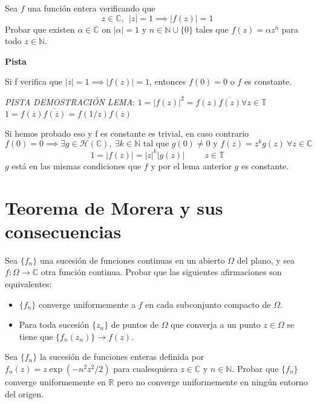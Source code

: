 \begin{ejer}
	Sea $f$ una función entera verificando que
	$$ z\in\mathbb{C}, \ \ |z|=1 \implies |f(z)|=1 $$
	Probar que existen $\alpha\in\mathbb{C}$ on $|\alpha|=1$ y $n\in\mathbb{N}\cup \{0\}$ tales que $f(z) = \alpha z^n$ para todo $z\in\mathbb{N}$.
\end{ejer}
\begin{sol}
	
	\textbf{Pista}
	
	\begin{lema}
		
		Si f verifica que $|z|=1 \implies |f(z)|=1$, entonces $f(0)=0$ o $f$ es constante.
		
		\textit{PISTA DEMOSTRACIÓN LEMA}:
		$1=|f(z)|^2 = f(z)\overline{f(z)} \forall z\in\mathbb{T}$ 
		$1= f(\overline{z})\overline{f(\overline{z})} = f(1/z)\overline{f(\overline{z})}$
	\end{lema}
	
	
	Si hemos probado eso y f es constante es trivial, en caso contrario
	$$f(0)=0 \implies \exists g\in\mathcal{H}(\mathbb{C}), \ \exists k\in\mathbb{N} \text{ tal que }g(0) \not =0 \text{ y }f(z) = z^kg(z)\ \forall z\in\mathbb{C}$$
	$$1=|f(z)| = |z|^k|g(z)| \hspace{1cm} z\in\mathbb{T}$$
	$g$ está en las mismas condiciones que $f$ y por el lema anterior $g$ es constante.
\end{sol}

\newpage


\section{Teorema de Morera y sus consecuencias}
\begin{ejer}
	Sea $\{f_n\}$ una sucesión de funciones continuas en un abierto $\Omega$ del plano, y sea $f:\Omega\rightarrow\mathbb{C}$ otra función continua. Probar que las siguientes afirmaciones son equivalentes:
	\begin{itemize}
		\item $\{f_n\}$ converge uniformemente a $f$ en cada subconjunto compacto de $\Omega$.
		\item Para toda sucesión $\{z_n\}$ de puntos de $\Omega$ que converja a un punto $z\in\Omega$ se tiene que $\{f_n(z_n)\}\rightarrow f(z)$.
	\end{itemize}
\end{ejer}

\begin{ejer}
	Sea $\{f_n\}$ la sucesión de funciones enteras definida por $f_n(z) = z\exp(-n^2z^2/2)$ para cualesquiera $z\in\mathbb{C}$ y $n\in\mathbb{N}$. Probar que $\{f_n\}$ converge uniformemente en $\mathbb{R}$ pero no converge uniformemente en ningún entorno del origen.
\end{ejer}

